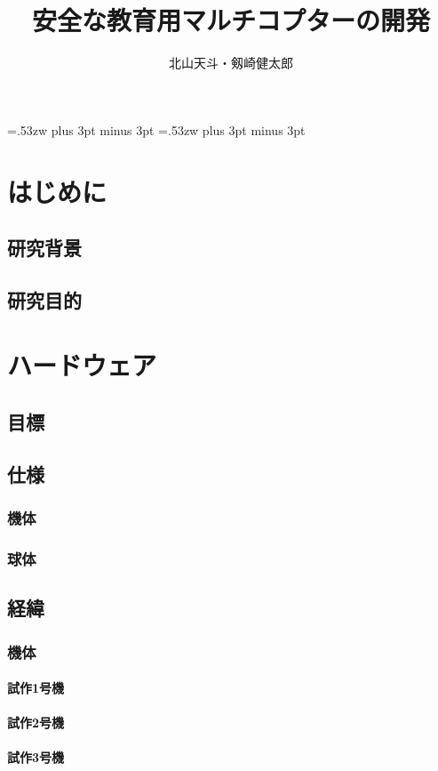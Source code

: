 \documentclass[12pt,oneside]{sotsuken_paper}
\title{安全な教育用マルチコプターの開発}
\author{北山天斗・剱崎健太郎}
\begin{document}
\setlength{\baselineskip}{9truemm}

\kanjiskip=.53zw plus 3pt minus 3pt
\xkanjiskip=.53zw plus 3pt minus 3pt

\tableofcontents


\chapter{はじめに}
\section{研究背景}
\section{研究目的}

\chapter{ハードウェア}
\section{目標}
\section{仕様}
\subsection{機体}
\subsection{球体}
\section{経緯}
\subsection{機体}
\subsubsection{試作1号機}
\subsubsection{試作2号機}
\subsubsection{試作3号機}
\end{document}
